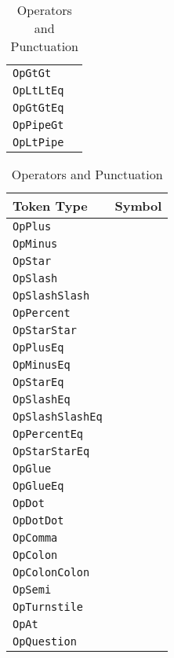 \begin{table}[h]
{\begin{tabular}[t]{ll}
        \texttt{OpGtGt} & \op{>>} \\
        \texttt{OpLtLtEq} & \op{<<=} \\
        \texttt{OpGtGtEq} & \op{>>=} \\
        \texttt{OpPipeGt} & \op{|>} \\
        \texttt{OpLtPipe} & \op{<|} \\
        \hline
    \end{tabular}
}
\hfill
\parbox[t]{0.45\linewidth}{
    \centering
    \begin{tabular}[t]{ll}
        \hline
        \textbf{Token Type} & \textbf{Symbol} \\
        \hline
        \texttt{OpPlus} & \op{+} \\
        \texttt{OpMinus} & \op{-} \\
        \texttt{OpStar} & \op{*} \\
        \texttt{OpSlash} & \op{/} \\
        \texttt{OpSlashSlash} & \op{//} \\
        \texttt{OpPercent} & \op{\%} \\
        \texttt{OpStarStar} & \op{**} \\
        \hline
        \texttt{OpPlusEq} & \op{+=} \\
        \texttt{OpMinusEq} & \op{-=} \\
        \texttt{OpStarEq} & \op{*=} \\
        \texttt{OpSlashEq} & \op{/=} \\
        \texttt{OpSlashSlashEq} & \op{//=} \\
        \texttt{OpPercentEq} & \op{\%=} \\
        \texttt{OpStarStarEq} & \op{**=} \\
        \hline
        \texttt{OpGlue} & \op{<>} \\
        \texttt{OpGlueEq} & \op{<>=} \\
        \hline
        \texttt{OpDot} & \op{.} \\
        \texttt{OpDotDot} & \op{..} \\
        \texttt{OpComma} & \op{,} \\
        \texttt{OpColon} & \op{:} \\
        \texttt{OpColonColon} & \op{::} \\
        \texttt{OpSemi} & \op{;} \\
        \texttt{OpTurnstile} & \op{<-} \\
        \hline
        \texttt{OpAt} & \op{@} \\
        \texttt{OpQuestion} & \op{?} \\
        \hline
    \end{tabular}
}
\caption{\label{tab:operators}Operators and Punctuation}
\end{table}


